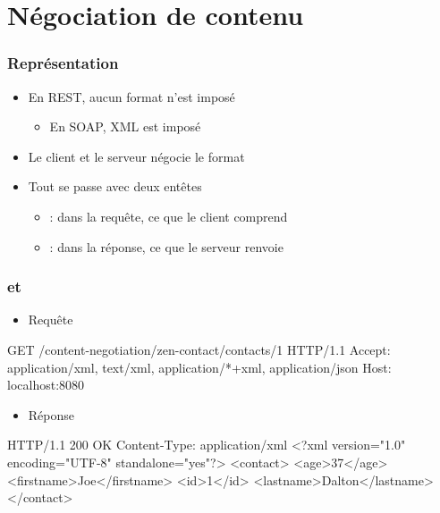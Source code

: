 \section{Négociation de contenu}


\begin{frame}
 \frametitle{Représentation}
 \begin{itemize}
  \item En REST, aucun format n'est imposé
  \begin{itemize}
   \item En SOAP, XML est imposé
  \end{itemize}
  \item Le client et le serveur négocie le format
  \item Tout se passe avec deux entêtes
  \begin{itemize}
   \item {} : dans la requête, ce que le client comprend
   \item {} : dans la réponse, ce que le serveur renvoie
  \end{itemize}
 \end{itemize}
\end{frame}

\begin{frame}[fragile]
 \frametitle{ et }
 \begin{itemize}
  \item Requête
 \end{itemize}
 \begin{textcode}
GET /content-negotiation/zen-contact/contacts/1 HTTP/1.1
Accept: application/xml, text/xml, application/*+xml, application/json
Host: localhost:8080
 \end{textcode}

 \begin{itemize}
  \item Réponse
 \end{itemize}
 \begin{textcode}
HTTP/1.1 200 OK
Content-Type: application/xml
<?xml version="1.0" encoding="UTF-8" standalone="yes"?>
<contact>
  <age>37</age>
  <firstname>Joe</firstname>
  <id>1</id>
  <lastname>Dalton</lastname>
</contact>
 \end{textcode}

\end{frame}

